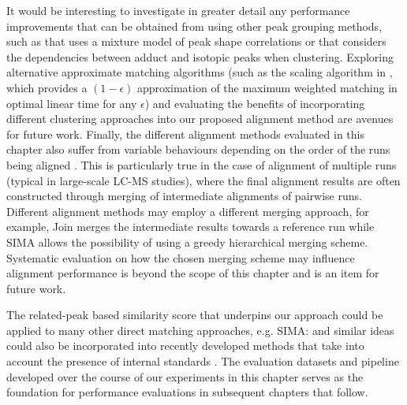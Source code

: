 It would be interesting to investigate in greater detail any performance improvements that can be obtained from using other peak grouping methods, such as \cite{Rogers2012} that uses a mixture model of peak shape correlations or \cite{Daly2014} that considers the dependencies between adduct and isotopic peaks when clustering. Exploring alternative approximate matching algorithms (such as the scaling algorithm in \cite{Maximum2011}, which provides a $(1-\epsilon)$ approximation of the maximum weighted matching in optimal linear time for any $\epsilon$) and evaluating the benefits of incorporating different clustering approaches into our proposed alignment method are avenues for future work. Finally, the different alignment methods evaluated in this chapter also suffer from variable behaviours depending on the order of the runs being aligned \cite{Smith2014}. This is particularly true in the case of alignment of multiple runs (typical in large-scale LC-MS studies), where the final alignment results are often constructed through merging of intermediate alignments of pairwise runs. Different alignment methods may employ a different merging approach, for example, Join merges the intermediate results towards a reference run while SIMA allows the possibility of using a greedy hierarchical merging scheme. Systematic evaluation on how the chosen merging scheme may influence alignment performance is beyond the scope of this chapter and is an item for future work.

The related-peak based similarity score that underpins our approach could be applied to many other direct matching approaches, e.g. SIMA: \cite{Voss2011a} and similar ideas could also be incorporated into recently developed methods that take into account the presence of internal standards \cite{Tsai2013a}. The evaluation datasets and pipeline developed over the course of our experiments in this chapter serves as the foundation for performance evaluations in subsequent chapters that follow.